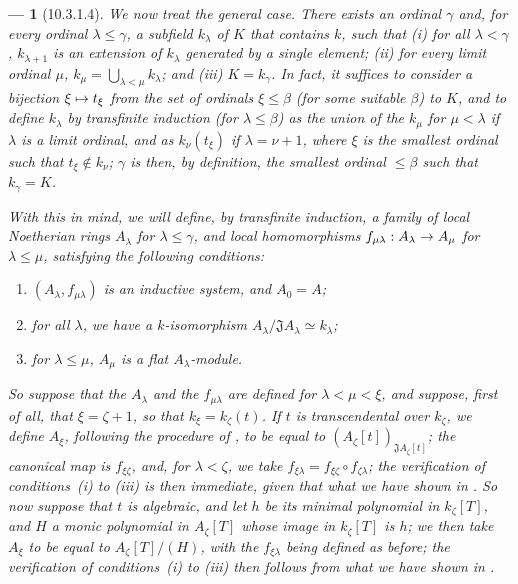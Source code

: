 \documentclass[oneside]{amsart}
\theoremstyle{ega-env-style}
\newtheorem*{env}{---}
\theoremstyle{ega-thm-env-style}
\theoremstyle{ega-defn-env-style}
\def\leq{\leqslant}                 %
\renewcommand{\to}{\mathchoice{\longrightarrow}{\rightarrow}{\rightarrow}{\rightarrow}}
\let\mapstoo\mapsto
\renewcommand{\mapsto}{\mathchoice{\longmapsto}{\mapstoo}{\mapstoo}{\mapstoo}}
\def\isoto{\simeq} %
\let\EGAOriginalLabel\label
\renewcommand{\label}[1]{\phantomsection\EGAOriginalLabel{#1}}
\begin{document}
\begin{env}[10.3.1.4]
\label{0.10.3.1.4}
We now treat the general case.
There exists an ordinal $\gamma$ and, for every ordinal $\lambda\leq\gamma$, a subfield $k_\lambda$ of $K$ that contains $k$, such that (i) for all $\lambda<\gamma$, $k_{\lambda+1}$ is an extension of $k_\lambda$ generated by a single element; (ii) for every limit ordinal $\mu$, $k_\mu=\bigcup_{\lambda<\mu}k_\lambda$; and (iii) $K=k_\gamma$.
In fact, it suffices to consider a bijection $\xi\mapsto t_\xi$ from the set of ordinals $\xi\leq\beta$ (for some suitable $\beta$) to $K$, and to define $k_\lambda$ by transfinite induction (for $\lambda\leq\beta$) as the union of the $k_\mu$ for $\mu<\lambda$ if $\lambda$ is a limit ordinal, and as $k_\nu(t_\xi)$ if $\lambda=\nu+1$, where $\xi$ is the smallest ordinal such that $t_\xi\not\in k_\nu$;
$\gamma$ is then, by definition, the smallest ordinal $\leq\beta$ such that $k_\gamma=K$.

With this in mind, we will define, by transfinite induction, a family of local Noetherian rings $A_\lambda$ for $\lambda\leq\gamma$, and local homomorphisms $f_{\mu\lambda}:A_\lambda\to A_\mu$ for $\lambda\leq\mu$, satisfying the following conditions:
\begin{enumerate}
  \item[(i)] $(A_\lambda,f_{\mu\lambda})$ is an inductive system, and $A_0=A$;
  \item[(ii)] for all $\lambda$, we have a $k$-isomorphism $A_\lambda/\mathfrak{J}A_\lambda\isoto k_\lambda$;
  \item[(iii)] for $\lambda\leq\mu$, $A_\mu$ is a flat $A_\lambda$-module.
\end{enumerate}

So suppose that the $A_\lambda$ and the $f_{\mu\lambda}$ are defined for $\lambda<\mu<\xi$, and suppose, first of all, that $\xi=\zeta+1$, so that $k_\xi=k_\zeta(t)$.
If $t$ is transcendental over $k_\zeta$, we define $A_\xi$, following the procedure of , to be equal to $(A_\zeta[t])_{\mathfrak{J}A_\zeta[t]}$;
the canonical map is $f_{\xi\zeta}$, and, for $\lambda<\zeta$, we take $f_{\xi\lambda}=f_{\xi\zeta}\circ f_{\zeta\lambda}$;
the verification of conditions~(i) to (iii) is then immediate, given that what we have shown in .
So now suppose that $t$ is algebraic, and let $h$ be its minimal polynomial in $k_\zeta[T]$, and $H$ a monic polynomial in $A_\zeta[T]$ whose image in $k_\zeta[T]$ is $h$;
we then take $A_\xi$ to be equal to $A_\zeta[T]/(H)$, with the $f_{\xi\lambda}$ being defined as before;
the verification of conditions~(i) to (iii) then follows from what we have shown in .


\end{env}
\end{document}
